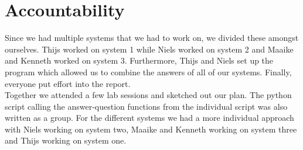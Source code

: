 \documentclass{article}
\begin{document}
\section*{Accountability}

Since we had multiple systems that we had to work on, we divided these amongst ourselves.
Thijs worked on system 1 while Niels worked on system 2 and Maaike and Kenneth worked on system 3.
Furthermore, Thijs and Niels set up the program which allowed us to combine the answers of all of our systems.
Finally, everyone put effort into the report.\\

Together we attended a few lab sessions and sketched out our plan. The python script calling the answer-question functions from the individual script was also written as a group. For the different systems we had a more individual approach with Niels working on system two, Maaike and Kenneth working on system three and Thijs working on system one. 
\end{document}
